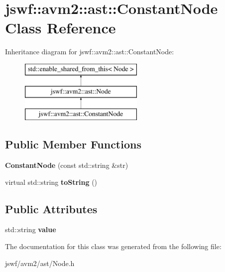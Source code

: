 \hypertarget{classjswf_1_1avm2_1_1ast_1_1_constant_node}{\section{jswf\+:\+:avm2\+:\+:ast\+:\+:Constant\+Node Class Reference}
\label{classjswf_1_1avm2_1_1ast_1_1_constant_node}
}
Inheritance diagram for jswf\+:\+:avm2\+:\+:ast\+:\+:Constant\+Node\+:\begin{figure}[H]
\begin{center}
\leavevmode
\includegraphics[height=3.000000cm]{classjswf_1_1avm2_1_1ast_1_1_constant_node}
\end{center}
\end{figure}
\subsection*{Public Member Functions}
\begin{DoxyCompactItemize}
\item 
\hypertarget{classjswf_1_1avm2_1_1ast_1_1_constant_node_ac38d4d91c7d76cf68b0f86580deb88f0}{{\bfseries Constant\+Node} (const std\+::string \&str)}\label{classjswf_1_1avm2_1_1ast_1_1_constant_node_ac38d4d91c7d76cf68b0f86580deb88f0}

\item 
\hypertarget{classjswf_1_1avm2_1_1ast_1_1_constant_node_a738a97d088ba21b6ba29d0fa9de2a6e3}{virtual std\+::string {\bfseries to\+String} ()}\label{classjswf_1_1avm2_1_1ast_1_1_constant_node_a738a97d088ba21b6ba29d0fa9de2a6e3}

\end{DoxyCompactItemize}
\subsection*{Public Attributes}
\begin{DoxyCompactItemize}
\item 
\hypertarget{classjswf_1_1avm2_1_1ast_1_1_constant_node_a27185ae5d7b462ac017527f5536b9cd4}{std\+::string {\bfseries value}}\label{classjswf_1_1avm2_1_1ast_1_1_constant_node_a27185ae5d7b462ac017527f5536b9cd4}

\end{DoxyCompactItemize}


The documentation for this class was generated from the following file\+:\begin{DoxyCompactItemize}
\item 
jswf/avm2/ast/Node.\+h\end{DoxyCompactItemize}
